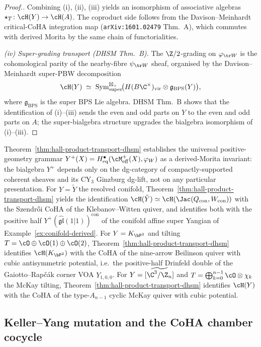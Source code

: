 \begin{proof}[Proof.]
Combining (i), (ii), (iii) yields an isomorphism of associative algebras $\star_T \colon \cH(Y) \to \cH(A)$. The coproduct side follows from the Davison--Meinhardt critical-CoHA integration map (\texttt{arXiv:1601.02479} Thm.~A), which commutes with derived Morita by the same chain of functorialities.

\emph{(iv) Super-grading transport (DHSM Thm.~B).} The $\Z/2$-grading on $\varphi_{\tr W}$ is the cohomological parity of the nearby-fibre $\psi_{\tr W}$ sheaf, organised by the Davison--Meinhardt super-PBW decomposition
\[
 \cH(Y) \;\simeq\; \mathrm{Sym}^{\boxtimes_{+}}_{\mathrm{super}}\!\bigl(H(B\C^{\times})_{\mathrm{vir}} \otimes \mathfrak{g}_{\mathrm{BPS}}(Y)\bigr),
\]
where $\mathfrak{g}_{\mathrm{BPS}}$ is the super BPS Lie algebra. DHSM Thm.~B shows that the identification of (i)--(iii) sends the even and odd parts on $Y$ to the even and odd parts on $A$; the super-bialgebra structure upgrades the bialgebra isomorphism of (i)--(iii).
\end{proof}

Theorem~\ref{thm:hall-product-transport-dhsm} establishes the universal positive-geometry grammar $Y^{+}(X) = H^{\bullet}_{\mathrm{eq}}(\cM^{+}_{\mathrm{eff}}(X), \varphi_W)$ as a derived-Morita invariant: the bialgebra $Y^{+}$ depends only on the dg-category of compactly-supported coherent sheaves and its CY$_3$ Ginzburg dg-lift, not on any particular presentation. For $Y = \tilde Y$ the resolved conifold, Theorem~\ref{thm:hall-product-transport-dhsm} yields the identification $\cH(\tilde Y) \simeq \cH(\Jac(Q_{\mathrm{con}}, W_{\mathrm{con}}))$ with the Szendr\H{o}i CoHA of the Klebanov--Witten quiver, and identifies both with the positive half $Y^{+}(\widehat{\mathfrak{gl}}(1|1))^{\mathrm{con}}$ of the conifold affine super Yangian of Example~\ref{ex:conifold-derived}. For $Y = K_{\bP^2}$ and tilting $T = \cO \oplus \cO(1) \oplus \cO(2)$, Theorem~\ref{thm:hall-product-transport-dhsm} identifies $\cH(K_{\bP^2})$ with the CoHA of the nine-arrow Beilinson quiver with cubic antisymmetric potential, i.e.\ the positive-half Drinfeld double of the Gaiotto--Rap\v{c}\'ak corner VOA $Y_{1,0,0}$. For $Y = \widetilde{[\C^3/\Z_n]}$ and $T = \bigoplus_{k = 0}^{n-1} \cO \otimes \chi_k$ the McKay tilting, Theorem~\ref{thm:hall-product-transport-dhsm} identifies $\cH(Y)$ with the CoHA of the type-$A_{n-1}$ cyclic McKay quiver with cubic potential.

\subsection{Keller--Yang mutation and the CoHA chamber cocycle}
\label{subsec:keller-yang-mutation-coha}

